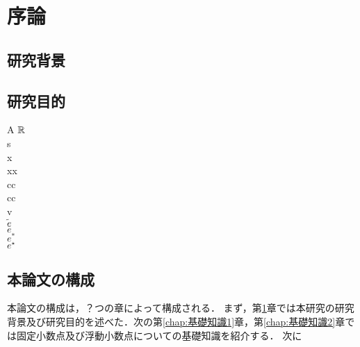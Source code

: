 \chapter{序論}
\label{chap:序論}
\section{研究背景}

\section{研究目的}
A $\mathbb{R}$ \\
s \\
x\\
xx\\
cc \\
cc\\
v\\
$\tilde{e} $\\
$\bar{e}$\\
$e^{\ast}$\\
$e^{\star}$\\
\section{本論文の構成}
本論文の構成は，？つの章によって構成される．
まず，第\ref{chap:序論}章では本研究の研究背景及び研究目的を述べた．次の第\ref{chap:基礎知識1}章，第\ref{chap:基礎知識2}章では固定小数点及び浮動小数点についての基礎知識を紹介する．
次に\cite{hopkins2020stochastic}
